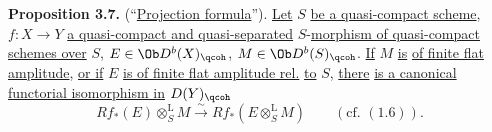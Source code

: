 \textbf{Proposition 3.7.} (``\uline{Projection formula}''). \uline{Let} \(S\) \uline{be a quasi-compact scheme}, \(f:X\to Y\) \uline{a quasi-compact and quasi-separated} \(S\)-\uline{morphism of quasi-compact schemes over} \(S\), \(E\in\Ob D^b(X)_{\qcoh}\), \(M\in\Ob D^b(S)_{\qcoh}\). \uline{If} \(M\) \uline{is} \uline{of finite flat amplitude}, \uline{or if} \(E\) \uline{is of finite flat amplitude rel.} \uline{to} \(S\), \uline{there}
%
\uline{is a canonical functorial isomorphism in} \(D(Y)_{\qcoh}\)
\[
 Rf_*(E)\otimes_S^{\mathrm L}M
 \xrightarrow{\sim}
 Rf_*(E\otimes_S^{\mathrm L}M)\qquad(\text{cf. }(1.6)).
\]

